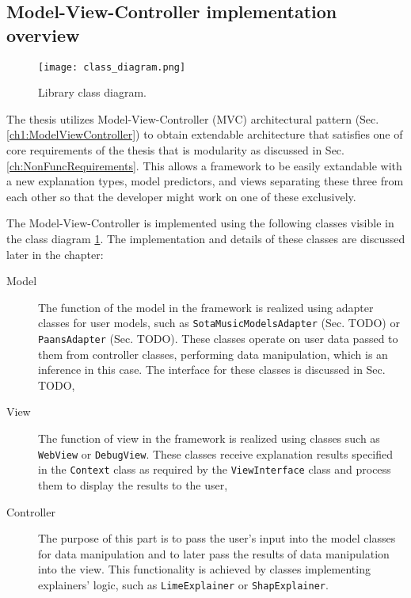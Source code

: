 \documentclass[
    bindingoffset=5mm,  %
    footnoteindent=3mm, %
    hyphenation=true    %
]{src/wut-thesis}
\begin{document}
\subsection{Model-View-Controller implementation overview}

\begin{figure}%
    \centering
    \texttt{[image: class\_diagram.png]}
    \caption{Library class diagram.}
    \label{fig:ClassDiagram}
\end{figure}

    The thesis utilizes Model-View-Controller (MVC) architectural pattern (Sec. \ref{ch1:ModelViewController}) to obtain extendable architecture that satisfies one of core requirements of the thesis that is modularity as discussed in Sec. \ref{ch:NonFuncRequirements}. This allows a framework to be easily extandable with a new explanation types, model predictors, and views separating these three from each other so that the developer might work on one of these exclusively.

    The Model-View-Controller is implemented using
    the following classes visible in the class diagram \ref{fig:ClassDiagram}. The implementation and details of these classes are discussed later in the chapter:
    \begin{description}
        \item[Model] The function of the model in the framework is realized using adapter classes for user models, such as \texttt{SotaMusicModelsAdapter} (Sec. TODO) or \texttt{PaansAdapter} (Sec. TODO). These classes operate on user data passed to them from controller classes, performing data manipulation, which is an inference in this case. The interface for these classes is discussed in Sec. TODO,

        \item[View] The function of view in the framework is realized using classes such as \texttt{WebView} or \texttt{DebugView}. These classes receive explanation results specified in the \texttt{Context} class as required by the \texttt{ViewInterface} class and process them to display the results to the user,

        \item[Controller] The purpose of this part is to pass the user’s input into the model
        classes for data manipulation and to later pass the results of data manipulation into 
        the view. This functionality is achieved by classes implementing explainers' logic, 
        such as \texttt{LimeExplainer} or \texttt{ShapExplainer}.

    \end{description}
\end{document}
